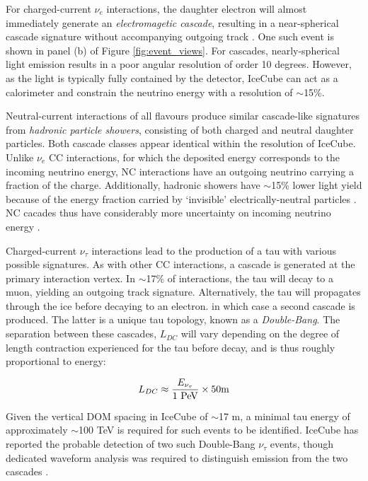 For charged-current $\nu_{e}$ interactions, the daughter electron will almost immediately generate an \emph{electromagetic cascade}, resulting in a near-spherical cascade signature without accompanying outgoing track . One such event is shown in panel (b) of Figure \ref{fig:event_views}. For cascades, nearly-spherical light emission results in a poor angular resolution of order 10 degrees. However, as the light is typically fully contained by the detector, IceCube can act as a calorimeter and constrain the neutrino energy with a resolution of $\sim$15\%. 

Neutral-current interactions of all flavours produce similar cascade-like signatures from \emph{hadronic particle showers}, consisting of both charged and neutral daughter particles. Both cascade classes appear identical within the resolution of IceCube. Unlike $\nu_{e}$ CC interactions, for which the deposited energy corresponds to the incoming neutrino energy, NC interactions have an outgoing neutrino carrying a fraction of the charge. Additionally, hadronic showers have $\sim$15\% lower light yield because of the energy fraction carried by `invisible' electrically-neutral particles \cite{ic_energy_reco_14}. NC cacades thus have considerably more uncertainty on incoming neutrino energy \cite{ic_energy_reco_14}.

Charged-current $\nu_{\tau}$ interactions lead to the production of a tau with various possible signatures. As with other CC interactions, a cascade is generated at the primary interaction vertex. In $\sim$17\% of interactions, the tau will decay to a muon, yielding an outgoing track signature. Alternatively, the tau will propagates through the ice before decaying to an electron. in which case a second cascade is produced. The latter is a unique tau topology, known as a \emph{Double-Bang}. The separation between these cascades, $L_{DC}$ will vary depending on the degree of length contraction experienced for the tau before decay, and is thus roughly proportional to energy:

\begin{equation}
	L_{DC}  \approx \frac{E_{\nu_{\tau}}}{\textup{1 PeV}} \times 50 \textup{m}
\end{equation}

Given the vertical  DOM spacing in IceCube of $\sim $17 m, a minimal tau energy of approximately $\sim$100 TeV is required for such events to be identified. IceCube has reported the probable detection of two such Double-Bang $\nu_{\tau}$ events, though dedicated waveform analysis was required to distinguish emission from the two cascades . 

